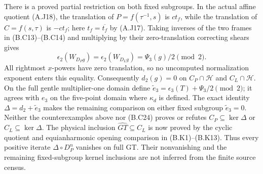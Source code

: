 There is a proved partial restriction on both fixed
subgroups.  In the actual affine quotient (A.J18), the
translation of $P=f(\tau^{-1},s)$ is $ct_f$, while the
translation of $C=f(s,\tau)$ is $-ct_f$; here
$t_f=\overline{t_f}$ by (A.J17).  Taking inverses of
the two frames in (B.C13)--(B.C14) and multiplying by
their zero-translation correcting shears gives
\[
 \epsilon_2(W_{D_P g})=\epsilon_2(W_{D_L g})
                  =\Psi_3(g)/2\pmod2.                  \tag{B.C24}
\]
All rightmost $x$-powers have zero translation, so no
uncomputed normalization exponent enters this equality.
Consequently $d_2(g)=0$ on $C_P\cap\mathcal H$ and
$C_L\cap\mathcal H$.  On the full gentle multiplier-one
domain define
$\widetilde e_3=\epsilon_3(T)+\Psi_3/2\pmod2$; it agrees
with $e_3$ on the five-point domain where $\kappa_d$ is
defined.  The exact identity
$\Delta=d_2+\widetilde e_3$ makes the remaining comparison
on either fixed subgroup $\widetilde e_3=0$.
Neither the counterexamples above
nor (B.C24) proves or refutes $C_P\subseteq\ker\Delta$
or $C_L\subseteq\ker\Delta$.  The physical inclusion $\widehat{GT}\subseteq C_L$ is now proved
by the cyclic quotient and equianharmonic opening comparison
in (B.K1)--(B.K13).  Thus every positive iterate
$\Delta\circ D_P^n$ vanishes on full GT.  Their nonvanishing
and the remaining fixed-subgroup kernel inclusions are not
inferred from the finite source census.
